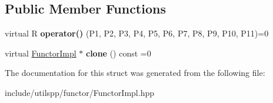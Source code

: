 \subsection*{Public Member Functions}
\begin{DoxyCompactItemize}
\item 
\hypertarget{structutilspp_1_1FunctorImpl_3_01R_00_01TYPE__LIST__11_07P1_00_01P2_00_01P3_00_01P4_00_01P5_00_02390a23e4d9e9c3c4133bb7a8d48a2c0_a73bbaa0f525b8af8d3103cd5ead17356}{virtual R {\bfseries operator()} (P1, P2, P3, P4, P5, P6, P7, P8, P9, P10, P11)=0}\label{structutilspp_1_1FunctorImpl_3_01R_00_01TYPE__LIST__11_07P1_00_01P2_00_01P3_00_01P4_00_01P5_00_02390a23e4d9e9c3c4133bb7a8d48a2c0_a73bbaa0f525b8af8d3103cd5ead17356}

\item 
\hypertarget{structutilspp_1_1FunctorImpl_3_01R_00_01TYPE__LIST__11_07P1_00_01P2_00_01P3_00_01P4_00_01P5_00_02390a23e4d9e9c3c4133bb7a8d48a2c0_ab16a312028f180e5552bb9fc9f15f451}{virtual \hyperlink{structutilspp_1_1FunctorImpl}{Functor\-Impl} $\ast$ {\bfseries clone} () const =0}\label{structutilspp_1_1FunctorImpl_3_01R_00_01TYPE__LIST__11_07P1_00_01P2_00_01P3_00_01P4_00_01P5_00_02390a23e4d9e9c3c4133bb7a8d48a2c0_ab16a312028f180e5552bb9fc9f15f451}

\end{DoxyCompactItemize}


The documentation for this struct was generated from the following file\-:\begin{DoxyCompactItemize}
\item 
include/utilspp/functor/Functor\-Impl.\-hpp\end{DoxyCompactItemize}
